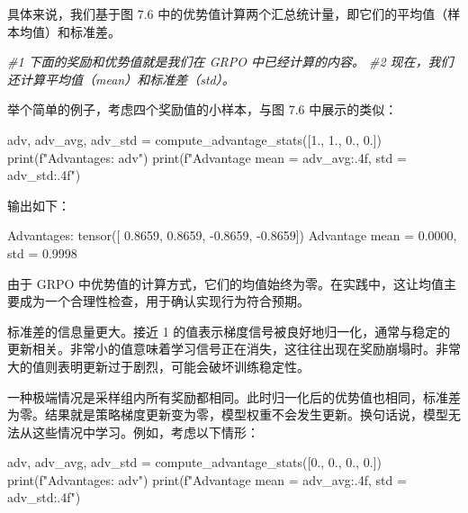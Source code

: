 具体来说，我们基于图 7.6 中的优势值计算两个汇总统计量，即它们的平均值（样本均值）和标准差。

{\noindent\small\textit{\#1 下面的奖励和优势值就是我们在 GRPO 中已经计算的内容。 \newline \#2 现在，我们还计算平均值（mean）和标准差（std）。}\par}

举个简单的例子，考虑四个奖励值的小样本，与图 7.6 中展示的类似：

\begin{codebox}
adv, adv_avg, adv_std = compute_advantage_stats([1., 1., 0., 0.])
print(f"Advantages: {adv}")
print(f"Advantage mean = {adv_avg:.4f}, std = {adv_std:.4f}")
\end{codebox}

输出如下：

\begin{codebox}
Advantages: tensor([ 0.8659,  0.8659, -0.8659, -0.8659])
Advantage mean = 0.0000, std = 0.9998
\end{codebox}

由于 GRPO 中优势值的计算方式，它们的均值始终为零。在实践中，这让均值主要成为一个合理性检查，用于确认实现行为符合预期。

标准差的信息量更大。接近 1 的值表示梯度信号被良好地归一化，通常与稳定的更新相关。非常小的值意味着学习信号正在消失，这往往出现在奖励崩塌时。非常大的值则表明更新过于剧烈，可能会破坏训练稳定性。

一种极端情况是采样组内所有奖励都相同。此时归一化后的优势值也相同，标准差为零。结果就是策略梯度更新变为零，模型权重不会发生更新。换句话说，模型无法从这些情况中学习。例如，考虑以下情形：

\begin{codebox}
adv, adv_avg, adv_std = compute_advantage_stats([0., 0., 0., 0.])
print(f"Advantages: {adv}")
print(f"Advantage mean = {adv_avg:.4f}, std = {adv_std:.4f}")
\end{codebox}

